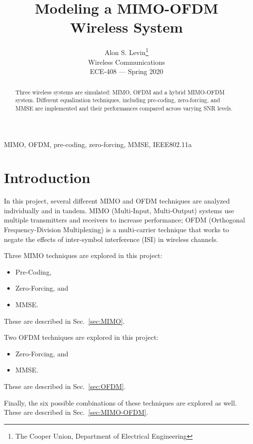 \documentclass[journal]{IEEEtran}
\begin{document}
\title{Modeling a MIMO-OFDM Wireless System}
\author{Alon S. Levin\thanks{The Cooper Union, Department of Electrical Engineering}\\Wireless Communications\\ECE-408 --- Spring 2020}
\maketitle

\begin{abstract}
Three wireless systems are simulated: MIMO, OFDM and a hybrid MIMO-OFDM system. Different equalization techniques, including pre-coding, zero-forcing, and MMSE are implemented and their performances compared across varying SNR levels.
\end{abstract}

\begin{IEEEkeywords}
MIMO, OFDM, pre-coding, zero-forcing, MMSE, IEEE802.11a
\end{IEEEkeywords}

\section{Introduction}\label{sec:intro}
In this project, several different MIMO and OFDM techniques are analyzed individually and in tandem. MIMO (Multi-Input, Multi-Output) systems use multiple transmitters and receivers to increase performance; OFDM (Orthogonal Frequency-Division Multiplexing) is a multi-carrier technique that works to negate the effects of inter-symbol interference (ISI) in wireless channels.

Three MIMO techniques are explored in this project:
\begin{itemize}
\item Pre-Coding,
\item Zero-Forcing, and
\item MMSE.
\end{itemize}
These are described in Sec.~\ref{sec:MIMO}.

Two OFDM techniques are explored in this project:
\begin{itemize}
\item Zero-Forcing, and
\item MMSE.
\end{itemize}
These are described in Sec.~\ref{sec:OFDM}.

Finally, the six possible combinations of these techniques are explored as well. These are described in Sec.~\ref{sec:MIMO-OFDM}.
\end{document}
